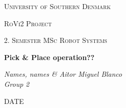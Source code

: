\documentclass[12pt,a4paper]{article}
\begin{document}
\begin{titlepage}
	\centering
	\vfill
	{\scshape\LARGE University of Southern Denmark\par}
	\vspace{1cm}
	{\scshape\Large RoVi2 Project\par}
	{\scshape\large 2. Semester MSc Robot Systems\par}
	\vspace{1.5cm}
	{\huge\bfseries Pick \& Place operation??\par}
	\vspace{2cm}
	{\Large\itshape Names, names \& Aitor Miguel Blanco \\ Group 2 \par}
	\vfill


	\vspace{2cm}

	DATE
\end{titlepage}

\pagebreak
\tableofcontents

\pagebreak
\listoffigures
\listoftables

\pagebreak

\cite{hargrove_lj_intuitive_2015}


\pagebreak


\end{document}
